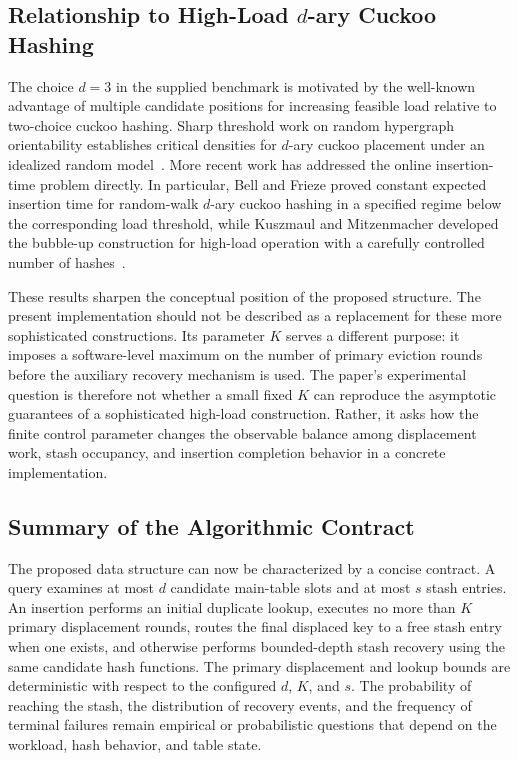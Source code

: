 \documentclass[conference]{IEEEtran}
\begin{document}
\subsection{Relationship to High-Load $d$-ary Cuckoo Hashing}

The choice $d=3$ in the supplied benchmark is motivated by the well-known advantage of multiple candidate positions for increasing feasible load relative to two-choice cuckoo hashing. Sharp threshold work on random hypergraph orientability establishes critical densities for $d$-ary cuckoo placement under an idealized random model~\cite{fountoulakis2012sharp,dietzfelbinger2009tight}. More recent work has addressed the online insertion-time problem directly. In particular, Bell and Frieze proved constant expected insertion time for random-walk $d$-ary cuckoo hashing in a specified regime below the corresponding load threshold, while Kuszmaul and Mitzenmacher developed the bubble-up construction for high-load operation with a carefully controlled number of hashes~\cite{bell2024constant,kuszmaul2025bubbling}.

These results sharpen the conceptual position of the proposed structure. The present implementation should not be described as a replacement for these more sophisticated constructions. Its parameter $K$ serves a different purpose: it imposes a software-level maximum on the number of primary eviction rounds before the auxiliary recovery mechanism is used. The paper's experimental question is therefore not whether a small fixed $K$ can reproduce the asymptotic guarantees of a sophisticated high-load construction. Rather, it asks how the finite control parameter changes the observable balance among displacement work, stash occupancy, and insertion completion behavior in a concrete implementation.

\subsection{Summary of the Algorithmic Contract}

The proposed data structure can now be characterized by a concise contract. A query examines at most $d$ candidate main-table slots and at most $s$ stash entries. An insertion performs an initial duplicate lookup, executes no more than $K$ primary displacement rounds, routes the final displaced key to a free stash entry when one exists, and otherwise performs bounded-depth stash recovery using the same candidate hash functions. The primary displacement and lookup bounds are deterministic with respect to the configured $d$, $K$, and $s$. The probability of reaching the stash, the distribution of recovery events, and the frequency of terminal failures remain empirical or probabilistic questions that depend on the workload, hash behavior, and table state.
\end{document}
